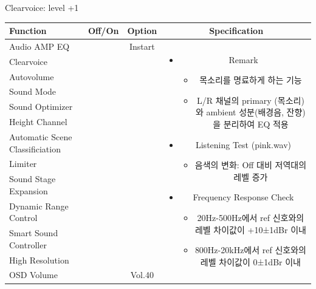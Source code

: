 \documentclass{beamer}
\begin{document}

\begin{frame}[t]{Clearvoice: level +1}
\begin{tiny}
\begin{tabular}{@{}lccc@{}}
\toprule
Function & Off/On & Option & Specification \\
\midrule
Audio AMP EQ & \color{black}{Off} & Instart &
\multirow{13}{60mm}{
\begin{itemize}
\item Remark
	\begin{itemize}
	\item 목소리를 명료하게 하는 기능
	\item L/R 채널의 primary (목소리)와 ambient 성분(배경음, 잔향)을 분리하여 EQ 적용
	\end{itemize}
\item Listening Test (pink.wav)
	\begin{itemize}
	\item 음색의 변화: Off 대비 저역대의 레벨 증가
	\end{itemize}
\item Frequency Response Check
  \begin{itemize}
  \item 20Hz-500Hz에서 ref 신호와의 레벨 차이값이 +10±1dBr 이내
  \item 800Hz-20kHz에서 ref 신호와의 레벨 차이값이 0±1dBr 이내
  \end{itemize}
\end{itemize}
} \\
Clearvoice & \color{blue}{On} & \color{blue}{+1} & \\
Autovolume & \color{black}{Off} & & \\
Sound Mode & \color{black}{Off} & & \\
Sound Optimizer & \color{black}{Off} & & \\
Height Channel & \color{black}{Off} & & \\
Automatic Scene Classificiation & \color{black}{Off} & & \\
Limiter & \color{black}{Off} & & \\
Sound Stage Expansion & \color{black}{Off} & & \\
Dynamic Range Control & \color{black}{Off} & & \\
Smart Sound Controller & \color{black}{Off} & & \\
High Resolution & \color{black}{Off} & & \\
OSD Volume & \color{blue}{On} & Vol.40 & \\
\midrule
\end{tabular}
\end{tiny}


\end{frame}
\end{document}
